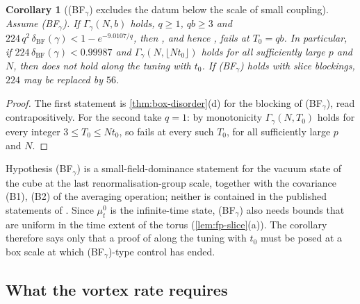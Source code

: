 \documentclass[11pt,a4paper]{amsart}
\newtheorem{corollary}[theorem]{Corollary}
\theoremstyle{definition}
\theoremstyle{remark}
\numberwithin{equation}{section}
\newcommand{\Mcirc}{\text{\upshape(M$^{\circ}$)}}   %
\newcommand{\Bcirc}{\text{\upshape(B$^{\circ}$)}}   %
\newcommand{\tzero}{t_0}                   %
\begin{document}
\begin{corollary}[\textup{(BF$_\gamma$)} excludes the datum below the scale of small coupling]\label{cor:BF-datum}
Assume \textup{(BF$_\gamma$)}. If $\Gamma_\gamma(N,b)$ holds, $q\ge1$, $qb\ge3$ and $224\,q^2\,\delta_{\mathrm{BF}}(\gamma)<1-e^{-9.0107/q}$, then \Bcirc{}, and hence \Mcirc{}, fails at $T_0=qb$. In particular, if $224\,\delta_{\mathrm{BF}}(\gamma)<0.99987$ and $\Gamma_\gamma(N,\lfloor N\tzero\rfloor)$ holds for all sufficiently large $p$ and $N$, then \Mcirc{} does not hold along the tuning with $\tzero$. If \textup{(BF$_\gamma$)} holds with slice blockings, $224$ may be replaced by $56$.
\end{corollary}

\begin{proof}
The first statement is \cref{thm:box-disorder}(d) for the blocking of \textup{(BF$_\gamma$)}, read contrapositively. For the second take $q=1$: by monotonicity $\Gamma_\gamma(N,T_0)$ holds for every integer $3\le T_0\le N\tzero$, so \Mcirc{} fails at every such $T_0$, for all sufficiently large $p$ and $N$.
\end{proof}

Hypothesis \textup{(BF$_\gamma$)} is a small-field-dominance statement for the vacuum state of the cube at the last renormalisation-group scale, together with the covariance \textup{(B1)}, \textup{(B2)} of the averaging operation; neither is contained in the published statements of \cite{balaban1989a,balaban1989b}. Since $\mu^0_t$ is the infinite-time state, \textup{(BF$_\gamma$)} also needs bounds that are uniform in the time extent of the torus (\cref{lem:fp-slice}(a)). The corollary therefore says only that a proof of \Mcirc{} along the tuning with $\tzero$ must be posed at a box scale at which \textup{(BF$_\gamma$)}-type control has ended.

\subsection{What the vortex rate requires}\label{sec:vortex-requires}
\end{document}
